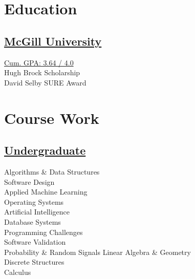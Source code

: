 \documentclass[]{sumbal-resume}
\begin{document}
\header




\section{Education}
\subsection{\href{http://www.abdullahsumbal.com/doc/transcript.pdf}{McGill University}}
\href{http://www.abdullahsumbal.com/doc/transcript.pdf}{Cum. GPA: 3.64 / 4.0}\\
Hugh Brock Scholarship \\
David Selby SURE Award
\sectionsep

\section{Course Work }
\subsection{\href{http://www.abdullahsumbal.com/doc/transcript.pdf}{Undergraduate}}
Algorithms \& Data Structures \\
Software Design \\
Applied Machine Learning \\
Operating Systems \\
Artificial Intelligence \\
Database Systems\\
Programming Challenges \\
Software Validation \\
Probability \& Random Signals
Linear Algebra \& Geometry \\
Discrete Structures \\
Calculus \\
\sectionsep
\end{document}
